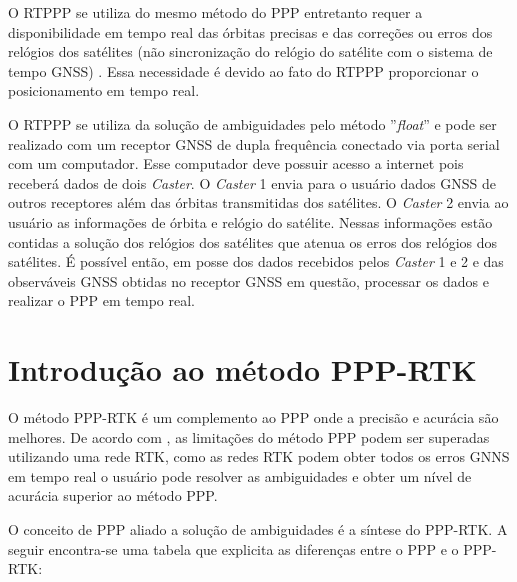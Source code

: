 \noindent

O RTPPP se utiliza do mesmo método do PPP entretanto requer a disponibilidade em tempo real das órbitas precisas e das correções ou erros dos relógios dos satélites (não sincronização do relógio do satélite com o sistema de tempo GNSS) \citep{marques2012ppp}. Essa necessidade é devido ao fato do RTPPP proporcionar o posicionamento em tempo real. 

O RTPPP se utiliza da solução de ambiguidades pelo método ''\textit{float}'' e pode ser realizado com um receptor GNSS de dupla frequência conectado via porta serial com um computador. Esse computador deve possuir acesso a internet pois receberá dados de dois \textit{Caster}. O \textit{Caster} 1 envia para o usuário dados GNSS de outros receptores além das órbitas transmitidas dos satélites. O \textit{Caster} 2 envia ao usuário as informações de órbita e relógio do satélite. Nessas informações estão contidas a solução dos relógios dos satélites que atenua os erros dos relógios dos satélites. É possível então, em posse dos dados recebidos pelos \textit{Caster} 1 e 2 e das observáveis GNSS obtidas no receptor GNSS em questão, processar os dados e realizar o PPP em tempo real.



\newpage
\section{Introdução ao método PPP-RTK}
\noindent

O método PPP-RTK é um complemento ao PPP onde a precisão e acurácia são melhores. De acordo com \cite{wubbena2005ppp}, as limitações do método PPP podem ser superadas utilizando uma rede RTK, como as redes RTK podem obter todos os erros GNNS em tempo real o usuário pode resolver as ambiguidades e obter um nível de acurácia superior ao método PPP.

O conceito de PPP aliado a solução de ambiguidades é a síntese do PPP-RTK. A seguir encontra-se uma tabela que explicita as diferenças entre o PPP e o PPP-RTK:

